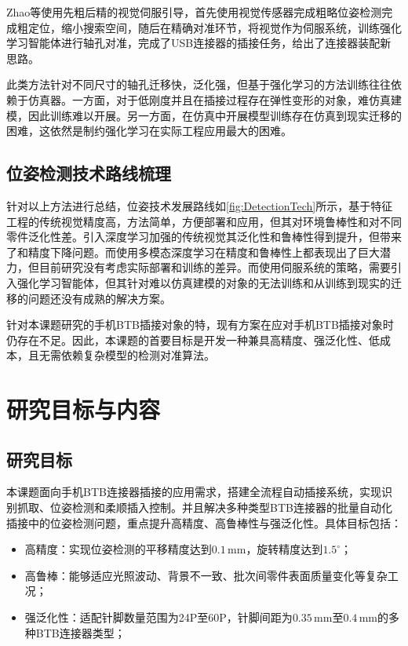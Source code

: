 \documentclass{Diploma}
\begin{document}
Zhao等使用先粗后精的视觉伺服引导，首先使用视觉传感器完成粗略位姿检测完成粗定位，缩小搜索空间，随后在精确对准环节，将视觉作为伺服系统，训练强化学习智能体进行轴孔对准，完成了USB连接器的插接任务，给出了连接器装配新思路\cite{zhao2023learning}。
%

此类方法针对不同尺寸的轴孔迁移快，泛化强，但基于强化学习的方法训练往往依赖于仿真器。一方面，对于低刚度并且在插接过程存在弹性变形的对象，难仿真建模，因此训练难以开展。另一方面，在仿真中开展模型训练存在仿真到现实迁移的困难，这依然是制约强化学习在实际工程应用最大的困难。
\subsection{位姿检测技术路线梳理}
针对以上方法进行总结，位姿技术发展路线如\ref{fig:DetectionTech}所示，基于特征工程的传统视觉精度高，方法简单，方便部署和应用，但其对环境鲁棒性和对不同零件泛化性差。引入深度学习加强的传统视觉其泛化性和鲁棒性得到提升，但带来了和精度下降问题。而使用多模态深度学习在精度和鲁棒性上都表现出了巨大潜力，但目前研究没有考虑实际部署和训练的差异。而使用伺服系统的策略，需要引入强化学习智能体，但其针对难以仿真建模的对象的无法训练和从训练到现实的迁移的问题还没有成熟的解决方案。

针对本课题研究的手机BTB插接对象的特，现有方案在应对手机BTB插接对象时仍存在不足。因此，本课题的首要目标是开发一种兼具高精度、强泛化性、低成本，且无需依赖复杂模型的检测对准算法。
\section{研究目标与内容}
\subsection{研究目标}
本课题面向手机BTB连接器插接的应用需求，搭建全流程自动插接系统，实现识别抓取、位姿检测和柔顺插入控制。并且解决多种类型BTB连接器的批量自动化插接中的位姿检测问题，重点提升高精度、高鲁棒性与强泛化性。具体目标包括：
\begin{itemize}
  \item 高精度：实现位姿检测的平移精度达到$0.1\,\mathrm{mm}$，旋转精度达到$1.5^{\circ}$； 
  \item 高鲁棒：能够适应光照波动、背景不一致、批次间零件表面质量变化等复杂工况；
  \item 强泛化性：适配针脚数量范围为24P至60P，针脚间距为$0.35\,\mathrm{mm}$至$0.4\,\mathrm{mm}$的多种BTB连接器类型； 
\end{itemize}
\end{document}

